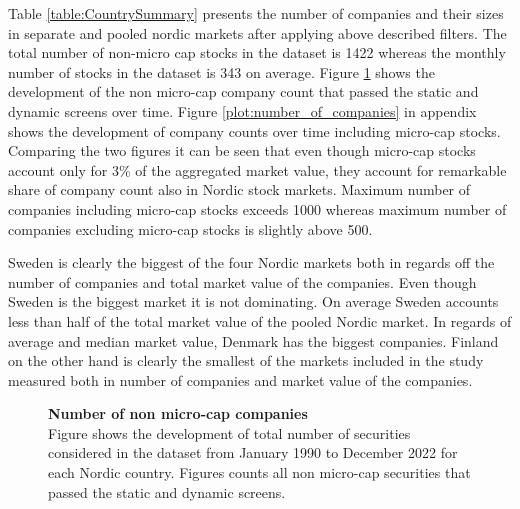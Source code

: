 \documentclass{article}
\begin{document}
Table \ref{table:CountrySummary} presents the number of companies and their sizes in separate and pooled nordic markets after applying above described filters. The total number of non-micro cap stocks in the dataset is 1422 whereas the monthly number of stocks in the dataset is 343 on average. Figure \ref{plot:number_of_companies_wo_micro} shows the development of the non micro-cap company count that passed the static and dynamic screens over time. Figure \ref{plot:number_of_companies} in appendix shows the development of company counts over time including micro-cap stocks. Comparing the two figures it can be seen that even though micro-cap stocks account only for 3\% of the aggregated market value, they account for remarkable share of company count also in Nordic stock markets. Maximum number of companies including micro-cap stocks exceeds 1000 whereas maximum number of companies excluding micro-cap stocks is slightly above 500. \par

Sweden is clearly the biggest of the four Nordic markets both in regards off the number of companies and total market value of the companies. Even though Sweden is the biggest market it is not dominating. On average Sweden accounts less than half of the total market value of the pooled Nordic market. In regards of average  and median market value, Denmark has the biggest companies. Finland on the other hand is clearly the smallest of the markets included in the study measured both in number of companies and market value of the companies. \par

\begin{figure}[ht]
\centering
\caption[Number of non micro-cap companies]{\textbf{Number of non micro-cap companies}\\ Figure shows the development of total number of securities considered in the dataset from January 1990 to December 2022 for each Nordic country. Figures counts all non micro-cap securities that passed the static and dynamic screens.}

\label{plot:number_of_companies_wo_micro}
\end{figure}
\end{document}
